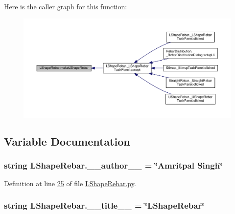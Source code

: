 Here is the caller graph for this function\+:\nopagebreak
\begin{figure}[H]
\begin{center}
\leavevmode
\includegraphics[width=350pt]{namespaceLShapeRebar_a647a28e94933108c6617da8532d76998_icgraph}
\end{center}
\end{figure}




\subsection{Variable Documentation}
\subsubsection[{\texorpdfstring{\+\_\+\+\_\+author\+\_\+\+\_\+}{__author__}}]{\setlength{\rightskip}{0pt plus 5cm}string L\+Shape\+Rebar.\+\_\+\+\_\+author\+\_\+\+\_\+ = \char`\"{}Amritpal Singh\char`\"{}\hspace{0.3cm}{\ttfamily [private]}}\hypertarget{namespaceLShapeRebar_ad398517c2df8a455dfd0b670e54285ea}{}\label{namespaceLShapeRebar_ad398517c2df8a455dfd0b670e54285ea}


Definition at line \hyperlink{LShapeRebar_8py_source_l00025}{25} of file \hyperlink{LShapeRebar_8py_source}{L\+Shape\+Rebar.\+py}.

\subsubsection[{\texorpdfstring{\+\_\+\+\_\+title\+\_\+\+\_\+}{__title__}}]{\setlength{\rightskip}{0pt plus 5cm}string L\+Shape\+Rebar.\+\_\+\+\_\+title\+\_\+\+\_\+ = \char`\"{}L\+Shape\+Rebar\char`\"{}\hspace{0.3cm}{\ttfamily [private]}}\hypertarget{namespaceLShapeRebar_a0ac8e9cb97e560c6ce362c1ac5144c31}{}\label{namespaceLShapeRebar_a0ac8e9cb97e560c6ce362c1ac5144c31}


